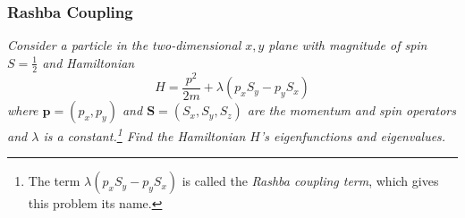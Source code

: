 \documentclass[11pt, a4paper]{article}
\renewcommand{\vec}[1]{\bm{#1}} %
\begin{document}
\subsubsection{Rashba Coupling}
\textit{Consider a particle in the two-dimensional $ x, y $ plane with magnitude of spin $ S = \frac{1}{2} $ and Hamiltonian}
\begin{equation*}
	H = \frac{p^{2}}{2m} + \lambda (p_{x}S_{y} - p_{y}S_{x})
\end{equation*}
\textit{where $ \vec{p} = (p_{x}, p_{y}) $ and $ \vec{S} = (S_{x}, S_{y}, S_{z}) $ are the momentum and spin operators and $ \lambda $ is a constant.\footnote{The term $ \lambda (p_{x}S_{y} - p_{y}S_{x}) $ is called the \textit{Rashba coupling term}, which gives this problem its name.} Find the Hamiltonian $ H $'s eigenfunctions and eigenvalues.}
\end{document}
